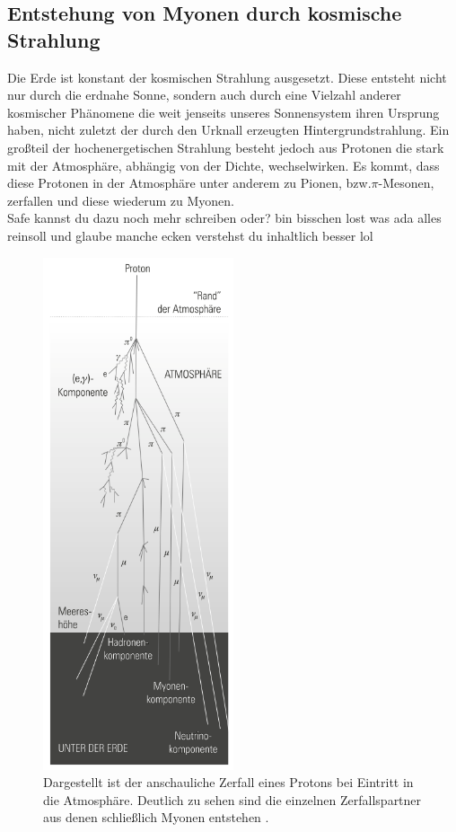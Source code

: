 \subsection{Entstehung von Myonen durch kosmische Strahlung}
Die Erde ist konstant der kosmischen Strahlung ausgesetzt. Diese entsteht nicht nur durch die erdnahe Sonne, sondern auch durch eine Vielzahl anderer kosmischer Phänomene die weit jenseits unseres Sonnensystem ihren Ursprung haben, nicht zuletzt der
durch den Urknall erzeugten Hintergrundstrahlung. Ein großteil der hochenergetischen Strahlung besteht jedoch aus Protonen die stark mit der Atmosphäre, abhängig von der Dichte, wechselwirken.
Es kommt, dass diese Protonen in der Atmosphäre unter anderem zu Pionen, bzw.$\pi$-Mesonen, zerfallen und diese wiederum zu Myonen. 
\\
\newline
Safe kannst du dazu noch mehr schreiben oder? bin bisschen lost was ada alles reinsoll und glaube manche ecken verstehst du inhaltlich besser lol

\begin{figure}
    \centering
    \includegraphics[width=0.5\textwidth]{bilder/zerfall.png}
    \caption{Dargestellt ist der anschauliche Zerfall eines Protons bei Eintritt in die Atmosphäre. 
            Deutlich zu sehen sind die einzelnen Zerfallspartner aus denen schließlich Myonen entstehen \cite{einfuehrung}.}
    \label{ehhnicht}
\end{figure}


